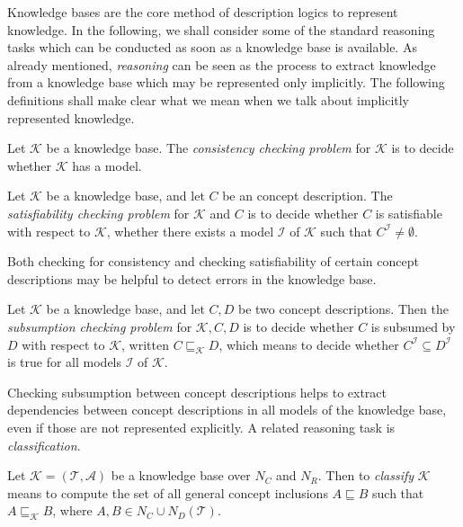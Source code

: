 Knowledge bases are the core method of description logics to represent knowledge.  In the
following, we shall consider some of the standard reasoning tasks which can be conducted
as soon as a knowledge base is available.  As already mentioned, \emph{reasoning} can be
seen as the process to extract knowledge from a knowledge base which may be represented
only implicitly.  The following definitions shall make clear what we mean when we talk
about implicitly represented knowledge.

\begin{Definition}
  \label{def:concistency-checking}
  Let $\mathcal{K}$ be a knowledge base.  The \emph{consistency checking problem} for
  $\mathcal{K}$ is to decide whether $\mathcal{K}$ has a model.
\end{Definition}

\begin{Definition}
  \label{def:satisfiability-checking}
  Let $\mathcal{K}$ be a knowledge base, and let $C$ be an concept description.  The
  \emph{satisfiability checking problem} for $\mathcal{K}$ and $C$ is to decide whether
  $C$ is satisfiable with respect to $\mathcal{K}$, \ie whether there exists a model
  $\mathcal{I}$ of $\mathcal{K}$ such that $C^{\mathcal{I}} \neq \emptyset$.
\end{Definition}

Both checking for consistency and checking satisfiability of certain concept descriptions
may be helpful to detect errors in the knowledge base.

\begin{Definition}
  \label{def:subsumption-checking}
  Let $\mathcal{K}$ be a knowledge base, and let $C, D$ be two concept descriptions.  Then
  the \emph{subsumption checking problem} for $\mathcal{K}, C, D$ is to decide whether $C$
  is subsumed by $D$ with respect to $\mathcal{K}$, written $C \sqsubseteq_{\mathcal{K}}
  D$, which means to decide whether $C^{\mathcal{I}} \subseteq D^{\mathcal{I}}$ is true
  for all models $\mathcal{I}$ of $\mathcal{K}$.
\end{Definition}

Checking subsumption between concept descriptions helps to extract dependencies between
concept descriptions in all models of the knowledge base, even if those are not
represented explicitly.  A related reasoning task is \emph{classification}.

\begin{Definition}[Classification]
  \label{def:classification}
  Let $\mathcal{K} = (\mathcal{T}, \mathcal{A})$ be a knowledge base over $N_{C}$ and
  $N_{R}$.  Then to \emph{classify} $\mathcal{K}$ means to compute the set of all general
  concept inclusions $A \sqsubseteq B$ such that $A \sqsubseteq_{\mathcal{K}} B$, where
  $A, B \in N_{C} \cup N_{D}(\mathcal{T})$.
\end{Definition}

